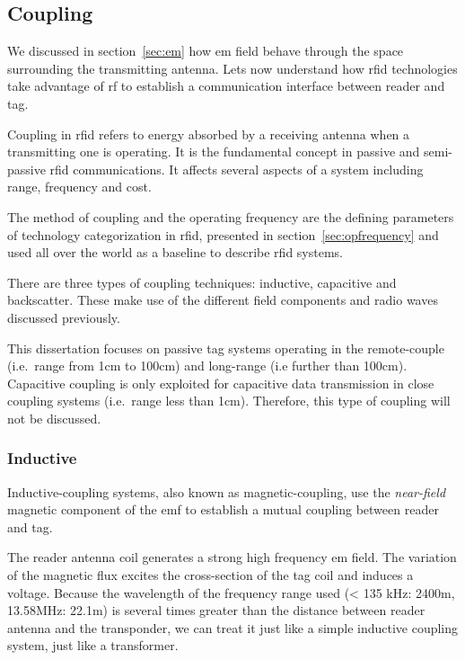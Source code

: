 \subsection{Coupling}


We discussed in section~\ref{sec:em} how \acl{em} field behave through the space surrounding the transmitting antenna. Lets now understand how \ac{rfid} technologies take advantage of \acl{rf} to establish a communication interface between reader and tag.

Coupling in \ac{rfid} refers to energy absorbed by a receiving antenna when a transmitting one is operating. 
It is the fundamental concept in passive and semi-passive \ac{rfid} communications.
It affects several aspects of a system including range, frequency and cost.

The method of coupling and the operating frequency are the defining parameters of technology categorization in \ac{rfid}, presented in section~\ref{sec:opfrequency} and used all over the world as a baseline to describe \ac{rfid} systems.

There are three types of coupling techniques: inductive, capacitive and backscatter. These make use of the different field components and radio waves discussed previously.

This dissertation focuses on passive tag systems operating in the remote-couple (i.e.\ range from 1cm to 100cm) and long-range (i.e further than 100cm).
Capacitive coupling is only exploited for capacitive data transmission in close coupling systems (i.e.\ range less than 1cm). Therefore, this type of coupling will not be discussed.

\subsubsection{Inductive}

Inductive-coupling systems, also known as magnetic-coupling, use the \emph{near-field} magnetic component of the \ac{emf} to establish a mutual coupling between reader and tag.

The reader antenna coil generates a strong high frequency \ac{em} field. The variation of the magnetic flux excites the cross-section of the tag coil and induces a voltage.
Because the wavelength of the frequency range used (< 135 kHz: 2400m, 13.58MHz: 22.1m) is several times greater than the distance between reader antenna and the transponder, we can treat it just like a simple inductive coupling system, just like a transformer.


